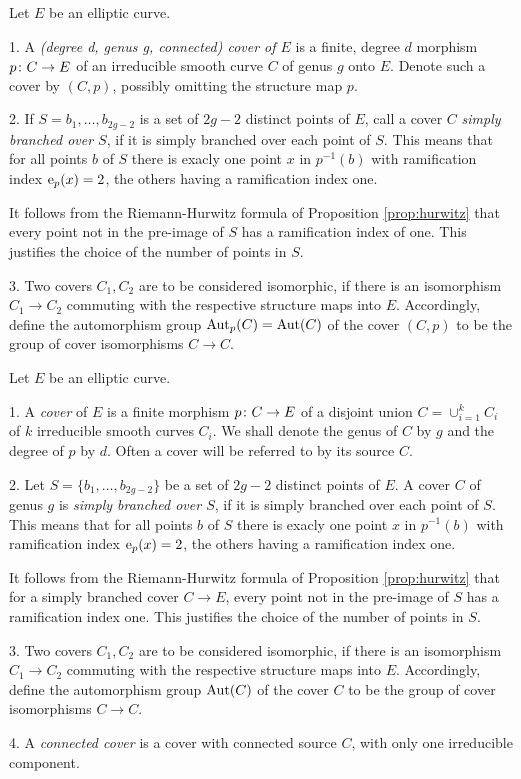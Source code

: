 \begin{defi} Let $E$ be an elliptic curve. 
 
  1. A \emph{(degree d, genus g, connected) cover of $E$} is a finite, degree $d$ morphism $p\colon C\to E$ of an irreducible smooth curve $C$ of genus $g$ onto $E$. Denote such a cover by $(C,p)$, possibly omitting the structure map $p$.

  2. If $S={b_1,\dotsc,b_{2g-2}}$ is a set of $2g-2$ distinct points of $E$, call a cover $C$ \emph{simply branched over $S$}, if it is simply branched over each point of $S$. This means that for all points $b$ of $S$ there is exacly one point $x$ in $p^{-1}(b)$ with ramification index $\operatorname{e}_p(x)=2$, the others having a ramification index one.
  
  It follows from the Riemann-Hurwitz formula of Proposition \ref{prop:hurwitz} that every point not in the pre-image of $S$ has a ramification index of one. This justifies the choice of the number of points in $S$.

  3. Two covers $C_1, C_2$ are to be considered isomorphic, if there is an isomorphism $C_1\to C_2$ commuting with the respective structure maps into $E$. Accordingly, define the automorphism group $\operatorname{Aut}_p(C)=\operatorname{Aut}(C)$ of the cover $(C,p)$ to be the group of cover isomorphisms $C\to C$. 
 
\end{defi}
\fi

\begin{defi} Let $E$ be an elliptic curve.
 
  1. A \emph{cover} of $E$ is a finite morphism $p\colon C\to E$ of a disjoint union $C=\cup_{i=1}^k C_i$ of $k$ irreducible smooth curves $C_i$. We shall denote the genus of $C$ by $g$ and the degree of $p$ by $d$. Often a cover will be referred to by its source $C$.
  
  2. Let $S=\{b_1,\dotsc,b_{2g-2}\}$ be a set of $2g-2$ distinct points of $E$. A cover $C$ of genus $g$ is \emph{simply branched over $S$}, if it is simply branched over each point of $S$. This means that for all points $b$ of $S$ there is exacly one point $x$ in $p^{-1}(b)$ with ramification index $\operatorname{e}_p(x)=2$, the others having a ramification index one.
  
  It follows from the Riemann-Hurwitz formula of Proposition \ref{prop:hurwitz} that for a simply branched cover $C\to E$, every point not in the pre-image of $S$ has a ramification index one. This justifies the choice of the number of points in $S$.
  
  3. Two covers $C_1, C_2$ are to be considered isomorphic, if there is an isomorphism $C_1\to C_2$ commuting with the respective structure maps into $E$. Accordingly, define the automorphism group $\operatorname{Aut}(C)$ of the cover $C$ to be the group of cover isomorphisms $C\to C$.
  
  4. A \emph{connected cover} is a cover with connected source $C$, \ie with only one irreducible component.
\end{defi}

